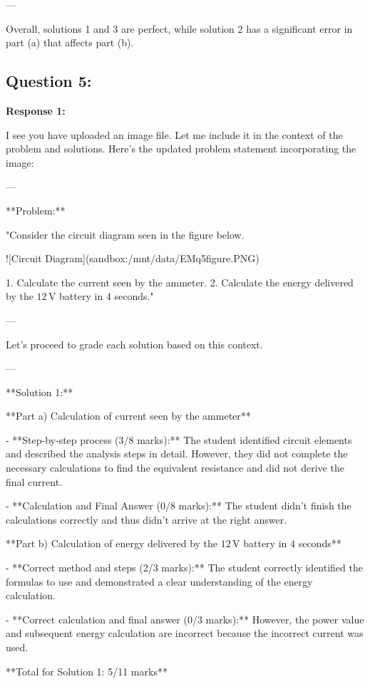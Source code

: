\documentclass[a4paper,11pt]{article}
\begin{document}
---

Overall, solutions 1 and 3 are perfect, while solution 2 has a significant error in part (a) that affects part (b).


\subsection*{Question 5:}

\textbf{Response 1:}

I see you have uploaded an image file. Let me include it in the context of the problem and solutions. Here's the updated problem statement incorporating the image:

---

**Problem:**

"Consider the circuit diagram seen in the figure below.

![Circuit Diagram](sandbox:/mnt/data/EMq5figure.PNG)

1. Calculate the current seen by the ammeter.
2. Calculate the energy delivered by the \(12\, \text{V}\) battery in \(4\) seconds."

---

Let's proceed to grade each solution based on this context.

---

**Solution 1:**

**Part a) Calculation of current seen by the ammeter**

- **Step-by-step process (3/8 marks):** The student identified circuit elements and described the analysis steps in detail. However, they did not complete the necessary calculations to find the equivalent resistance and did not derive the final current.

- **Calculation and Final Answer (0/8 marks):** The student didn't finish the calculations correctly and thus didn't arrive at the right answer.

**Part b) Calculation of energy delivered by the \(12\, \text{V}\) battery in \(4\) seconds**

- **Correct method and steps (2/3 marks):** The student correctly identified the formulas to use and demonstrated a clear understanding of the energy calculation.

- **Correct calculation and final answer (0/3 marks):** However, the power value and subsequent energy calculation are incorrect because the incorrect current was used.

**Total for Solution 1: 5/11 marks**
\end{document}
